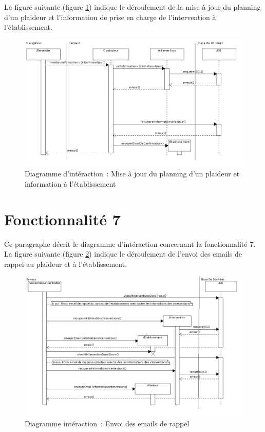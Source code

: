 La figure suivante (figure \ref{diagrammeInteraction8}) indique le déroulement de la mise à jour du planning d'un plaideur et l'information de prise en charge de l'intervention à l'établissement.
\begin{figure}[H]
	\centering
	\includegraphics[scale=0.5]{images/diagrammesInteraction/08_diagrammeInteractionF6.png}
	\caption{Diagramme d'intéraction~: Mise à jour du planning d'un plaideur et information à l'établissement}
	\label{diagrammeInteraction8}
\end{figure}




\section{Fonctionnalité 7}
Ce paragraphe décrit le diagramme d'intéraction concernant la fonctionnalité 7.\\

La figure suivante (figure \ref{diagrammeInteraction9}) indique le déroulement de l'envoi des emails de rappel au plaideur et à l'établissement.
\begin{figure}[H]
	\centering
	\includegraphics[scale=0.5]{images/diagrammesInteraction/09_diagrammeInteractionF7.png}
	\caption{Diagramme intéraction~: Envoi des emails de rappel}
	\label{diagrammeInteraction9}
\end{figure}